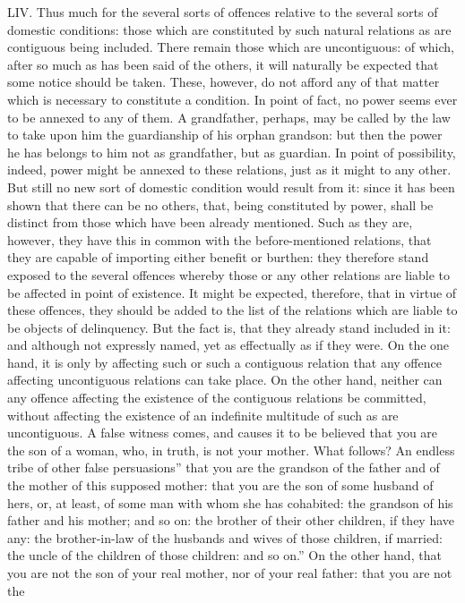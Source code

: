 \documentclass[12pt]{report}
\begin{document}
LIV. Thus much for the several sorts of offences relative to the several
sorts of domestic conditions: those which are constituted by such
natural relations as are contiguous being included. There remain those
which are uncontiguous: of which, after so much as has been said of the
others, it will naturally be expected that some notice should be taken.
These, however, do not afford any of that matter which is necessary to
constitute a condition. In point of fact, no power seems ever to be
annexed to any of them. A grandfather, perhaps, may be called by the law
to take upon him the guardianship of his orphan grandson: but then the
power he has belongs to him not as grandfather, but as guardian. In
point of possibility, indeed, power might be annexed to these relations,
just as it might to any other. But still no new sort of domestic
condition would result from it: since it has been shown that there can
be no others, that, being constituted by power, shall be distinct from
those which have been already mentioned. Such as they are, however, they
have this in common with the before-mentioned relations, that they are
capable of importing either benefit or burthen: they therefore stand
exposed to the several offences whereby those or any other relations are
liable to be affected in point of existence. It might be expected,
therefore, that in virtue of these offences, they should be added to the
list of the relations which are liable to be objects of delinquency. But
the fact is, that they already stand included in it: and although not
expressly named, yet as effectually as if they were. On the one hand, it
is only by affecting such or such a contiguous relation that any offence
affecting uncontiguous relations can take place. On the other hand,
neither can any offence affecting the existence of the contiguous
relations be committed, without affecting the existence of an indefinite
multitude of such as are uncontiguous. A false witness comes, and causes
it to be believed that you are the son of a woman, who, in truth, is not
your mother. What follows? An endless tribe of other false
persuasions'' that you are the grandson of the father and of the
mother of this supposed mother: that you are the son of some husband of
hers, or, at least, of some man with whom she has cohabited: the
grandson of his father and his mother; and so on: the brother of their
other children, if they have any: the brother-in-law of the husbands and
wives of those children, if married: the uncle of the children of those
children: and so on.'' On the other hand, that you are not the
son of your real mother, nor of your real father: that you are not the
\end{document}
